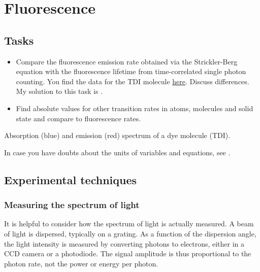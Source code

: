 \renewcommand{\lastmod}{March 15, 2024}
\renewcommand{\chapterauthors}{Markus Lippitz}


\chapter{Fluorescence}


\section{Tasks}

\begin{itemize}
\item Compare the fluorescence emission rate obtained via the Strickler-Berg equation with the fluorescence lifetime from time-correlated single photon counting. You find the data for the TDI molecule \href{https://github.com/Lippitz-Lab/Spectroscopy/tree/main/1_fundamentals/2_fluorescence/handout}{here}. Discuss differences. My solution to this task is .


\item Find absolute values for other transition rates in atoms, molecules and solid state and compare to fluorescence rates.

\end{itemize}

\begin{marginfigure}

  \caption{Absorption (blue) and emission (red) spectrum of a dye molecule (TDI).}
\end{marginfigure}

In case you have doubts about the units of variables and equations, see .


\section{Experimental techniques}



\subsection{Measuring the spectrum of light}

It is helpful to consider how the spectrum of light is actually measured. A beam of light is dispersed, typically on a grating. As a function of the dispersion angle, the light intensity is measured by converting photons to electrons, either in a CCD camera or a photodiode. The signal amplitude is thus proportional to the photon rate, not the power or energy per photon.


